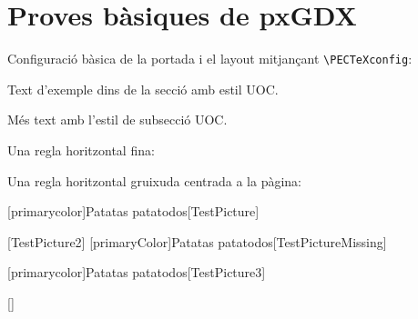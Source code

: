 \documentclass[fake,cover-config=offset,default]{P3CTeX}
\begin{document}
	\section{Proves bàsiques de pxGDX}

	Configuració bàsica de la portada i el layout mitjançant \texttt{\textbackslash PECTeXconfig}:




	Text d'exemple dins de la secció amb estil UOC.

	Més text amb l'estil de subsecció UOC.

	Una regla horitzontal fina:\\
	\pxHRule

	Una regla horitzontal gruixuda centrada a la pàgina:\\
	\pxPageRule*

	[primarycolor]{Patatas patatodos}[TestPicture]

	[TestPicture2]
	[primaryColor]{Patatas patatodos}[TestPictureMissing]

	[primarycolor]{Patatas patatodos}[TestPicture3]

	[\linewidth]
\end{document}
